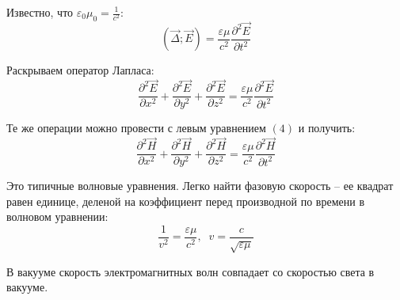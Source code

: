 \documentclass{article}
\begin{document}
	Известно, что $\varepsilon_0\mu_0=\frac{1}{c^2}$:
	\begin{equation}
		(\vec\Delta;\vec E) = \frac{\varepsilon\mu}{c^2}\frac{\partial^2\vec E}{\partial t^2}
	\end{equation}

	Раскрываем оператор Лапласа:
	\begin{equation}
		\frac{\partial^2\vec E}{\partial x^2} + \frac{\partial^2\vec E}{\partial y^2} + \frac{\partial^2\vec E}{\partial z^2} = \frac{\varepsilon\mu}{c^2}\frac{\partial^2\vec E}{\partial t^2}
	\end{equation}

	Те же операции можно провести с левым уравнением $(4)$ и получить:
	\begin{equation}
		\frac{\partial^2\vec H}{\partial x^2} + \frac{\partial^2\vec H}{\partial y^2} + \frac{\partial^2\vec H}{\partial z^2} = \frac{\varepsilon\mu}{c^2}\frac{\partial^2\vec H}{\partial t^2}		
	\end{equation}

	Это типичные волновые уравнения. Легко найти фазовую скорость -- ее квадрат равен единице, деленой на коэффициент перед производной по времени в волновом уравнении:
	\begin{equation}
		\frac{1}{v^2}=\frac{\varepsilon\mu}{c^2},\;\;v=\frac{c}{\sqrt{\varepsilon\mu}}
	\end{equation}

	В вакууме скорость электромагнитных волн совпадает со скоростью света в вакууме.
\end{document}
